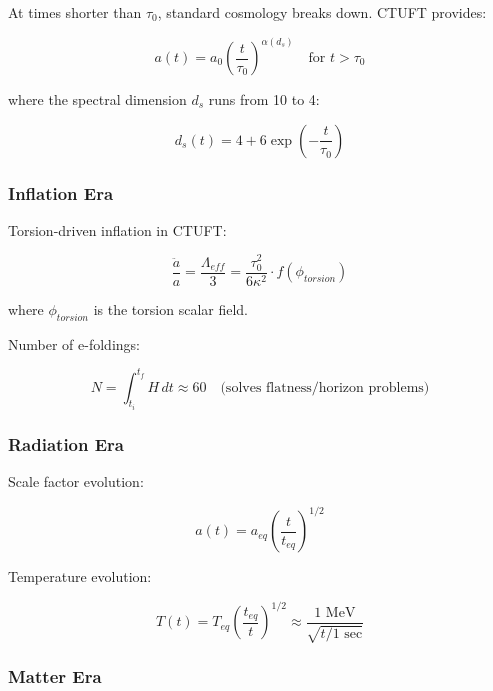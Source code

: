 At times shorter than $\tau_0$, standard cosmology breaks down. CTUFT provides:

\begin{equation}
    a(t) = a_0 \left(\frac{t}{\tau_0}\right)^{\alpha(d_s)} \quad \text{for } t > \tau_0
\end{equation}

where the spectral dimension $d_s$ runs from 10 to 4:

\begin{equation}
    d_s(t) = 4 + 6 \exp\left(-\frac{t}{\tau_0}\right)
\end{equation}

\subsubsection{Inflation Era}

Torsion-driven inflation in CTUFT:

\begin{equation}
    \frac{\ddot{a}}{a} = \frac{\Lambda_{eff}}{3} = \frac{\tau_0^2}{6\kappa^2} \cdot f(\phi_{torsion})
\end{equation}

where $\phi_{torsion}$ is the torsion scalar field.

Number of e-foldings:

\begin{equation}
    N = \int_{t_i}^{t_f} H \, dt \approx 60 \quad \text{(solves flatness/horizon problems)}
\end{equation}

\subsubsection{Radiation Era}

Scale factor evolution:

\begin{equation}
    a(t) = a_{eq} \left(\frac{t}{t_{eq}}\right)^{1/2}
\end{equation}

Temperature evolution:

\begin{equation}
    T(t) = T_{eq} \left(\frac{t_{eq}}{t}\right)^{1/2} \approx \frac{1\text{ MeV}}{\sqrt{t/1\text{ sec}}}
\end{equation}

\subsubsection{Matter Era}

